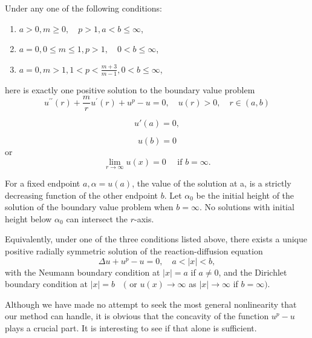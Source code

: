 \begin{theorem}
  Under any one of the following conditions:
  \begin{enumerate}
    \item $a>0, m \geq 0, \quad p>1, a<b \leq \infty$,
    \item $a=0,0 \leq m \leq 1, p>1, \quad 0<b \leq \infty$,
    \item $a=0, m>1,1<p<\frac{m+3}{m-1}, 0<b \leq \infty$,
  \end{enumerate}
  here is exactly one positive solution to the boundary value problem
  \begin{equation}\label{eq:5.1}
    u^{\prime \prime}(r)+\frac{m}{r} u^{\prime}(r)+u^p-u =0, \quad u(r)>0, \quad r \in(a, b)  
  \end{equation}
  
  \begin{equation}\label{eq:5.2}
    u'(a) = 0,
  \end{equation}

  \begin{equation}\label{eq:5.3}
    u(b) = 0
  \end{equation}
  or
  \begin{equation}\label{eq:5.4}
    \lim _{r \rightarrow \infty} u(x)=0 \quad \text { if } b=\infty.
  \end{equation}

  For a fixed endpoint $a, \alpha=u(a)$, the value of the solution at a, is a strictly decreasing function of the other endpoint $b$. Let $\alpha_0$ be the initial height of the solution of the boundary value problem when $b=\infty$. No solutions with initial height below $\alpha_0$ can intersect the $r$-axis.

  Equivalently, under one of the three conditions listed above, there exists a unique positive radially symmetric solution of the reaction-diffusion equation
  \begin{equation}\label{eq:5.5}
    \Delta u+u^p-u=0, \quad a<|x|<b,    
  \end{equation}
  with the Neumann boundary condition at $|x|=a$ if $a \neq 0$, and the Dirichlet boundary condition at $|x|=b \quad($ or $u(x) \rightarrow \infty$ as $|x| \rightarrow \infty$ if $b=\infty)$.
\end{theorem}

Although we have made no attempt to seek the most general nonlinearity that our method can handle, it is obvious that the concavity of the function $u^p-u$ plays a crucial part. It is interesting to see if that alone is sufficient.